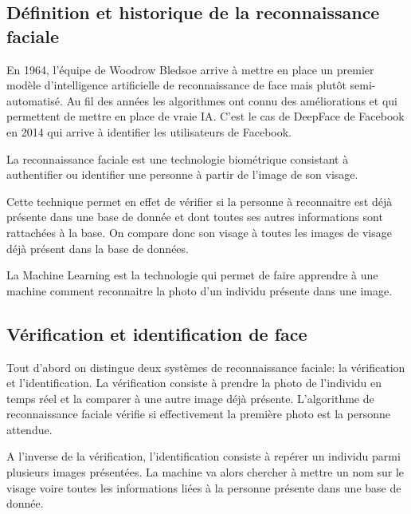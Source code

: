 \documentclass[12pt, letterpaper]{article}
\begin{document}
\subsection{Définition et historique de la reconnaissance faciale}
\par En 1964, l'équipe de Woodrow Bledsoe arrive à mettre en place un premier modèle d'intelligence artificielle de reconnaissance de face mais plutôt semi-automatisé. Au fil des années les algorithmes ont connu des améliorations et qui permettent de mettre en place de vraie IA. C'est le cas de DeepFace de Facebook en 2014 qui arrive à identifier les utilisateurs de Facebook.\\
\par La reconnaissance faciale est une technologie biométrique consistant à authentifier ou identifier une personne à partir de l’image de son visage.
\par Cette technique permet en effet de vérifier si la personne à reconnaitre est déjà présente dans une base de donnée et dont toutes ses autres informations sont rattachées à la base. 
On compare donc son visage à toutes les images de visage déjà présent dans la base de données.
\par La Machine Learning est la technologie qui permet de faire apprendre à une machine comment reconnaitre la photo d’un individu présente dans une image.  


\subsection{Vérification et identification de face}
\par Tout d'abord on distingue deux systèmes de reconnaissance faciale: la vérification et l'identification.
La vérification consiste à prendre la photo de l'individu en temps réel et la comparer à une autre image déjà présente. L'algorithme de reconnaissance faciale vérifie si effectivement la première photo est la personne attendue.\\
\par A l'inverse de la vérification, l'identification consiste à repérer un individu parmi plusieurs images présentées. La machine va alors chercher à mettre un nom sur le visage voire toutes les informations liées à la personne présente dans une base de donnée.
\end{document}
